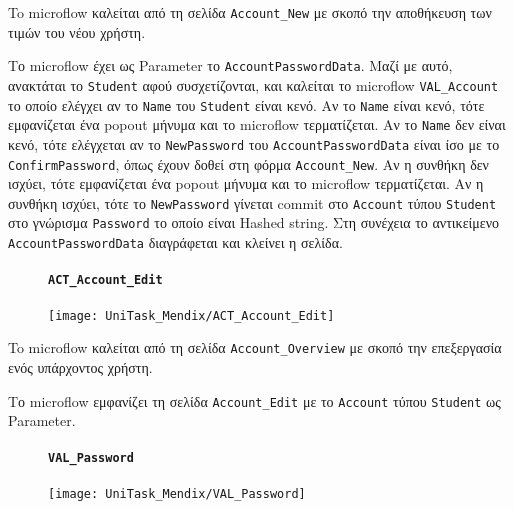                     To microflow καλείται από τη σελίδα \texttt{Account\_New} με σκοπό την αποθήκευση των τιμών του νέου χρήστη.

                    Το microflow έχει ως Parameter το \texttt{AccountPasswordData}. Μαζί με αυτό, ανακτάται το \texttt{Student} αφού συσχετίζονται, και καλείται το microflow \texttt{VAL\_Account} το οποίο ελέγχει αν το \texttt{Name} του \texttt{Student} είναι κενό. Αν το \texttt{Name} είναι κενό, τότε εμφανίζεται ένα popout μήνυμα και το microflow τερματίζεται. Αν το \texttt{Name} δεν είναι κενό, τότε ελέγχεται αν το \texttt{NewPassword} του \texttt{AccountPasswordData} είναι ίσο με το \texttt{ConfirmPassword}, όπως έχουν δοθεί στη φόρμα \texttt{Account\_New}. Αν η συνθήκη δεν ισχύει, τότε εμφανίζεται ένα popout μήνυμα και το microflow τερματίζεται. Αν η συνθήκη ισχύει, τότε το \texttt{NewPassword} γίνεται commit στο \texttt{Account} τύπου \texttt{Student} στο γνώρισμα \texttt{Password} το οποίο είναι Hashed string. Στη συνέχεια το αντικείμενο \texttt{AccountPasswordData} διαγράφεται και κλείνει η σελίδα.

                \begin{figure}[H] \noindent
                    \paragraph{\texttt{ACT\_Account\_Edit}}
                    \begin{center}
                        \texttt{[image: UniTask\_Mendix/ACT\_Account\_Edit]}
                    \end{center}
                \end{figure}

                    To microflow καλείται από τη σελίδα \texttt{Account\_Overview} με σκοπό την επεξεργασία ενός υπάρχοντος χρήστη.

                    Το microflow εμφανίζει τη σελίδα \texttt{Account\_Edit} με το \texttt{Account} τύπου \texttt{Student} ως Parameter.

                \begin{figure}[H] \noindent
                    \paragraph{\texttt{VAL\_Password}}
                    \begin{center}
                        \texttt{[image: UniTask\_Mendix/VAL\_Password]}
                    \end{center}
                \end{figure}

